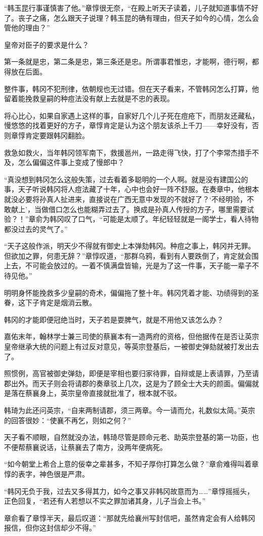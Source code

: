 “韩玉昆行事谨慎害了他。”章惇很无奈，“在殿上听天子读着，儿子就知道事情不好了。丧子之痛，怎么跟天子说理？韩玉昆的确有理由，但天子如今的心情，怎么会管他的理由？”

皇帝对臣子的要求是什么？

第一条就是忠，第二条是忠，第三条还是忠。所谓事君惟忠，才能啊，德行啊，都得放在后面。

整件事，韩冈不犯刑律，依朝规也无过错。但在天子看来，不管韩冈怎么打算，他留着能挽救皇嗣的种痘法没有献上去就是不忠的表现。

将心比心，如果自家遇上这样的事，自家好几个儿子死在痘疮下，而朋友还藏私，慢悠悠的找着更好的方子，章惇肯定是认为这个朋友该杀上千刀——幸好没有，否则章惇肯定要跟韩冈翻脸。

救急如救火，当年韩冈领军南下，救援邕州，一路走得飞快，打了个李常杰措手不及，怎么偏偏这件事上变成了慢郎中？

“真没想到韩冈怎么这般失策，过去看着多聪明的一个人啊。就是没有建国公的事，天子听说韩冈将人痘法藏了十年，心中也会好一阵不舒服。在奏章中，他根本就没必要将孙真人扯进来，直接说在广西无意中发现的不就好了？‘不经明验，不敢献上’，当做借口怎么也能糊弄过去了。换成是孙真人传授的方子，哪里需要试验？！”章俞为韩冈叹了口气，“可能是太顺了。年纪轻轻就是一阁学士，看人待物都没过去的灵气了。”

“天子这般作派，明天少不得就有御史上本弹劾韩冈。种痘之事上，韩冈并无罪。但欲加之罪，何患无辞？”章惇叹道，“那群乌鸦，看到有人要跌倒了，肯定就会围上去，不可能会放过的。一着不慎满盘皆输，光是为了这一件事，天子能一辈子不待见他。”

明明身怀能挽救多少皇嗣的奇术，偏偏拖了整十年。韩冈凭着才能、功绩得到的圣眷，这下子肯定是烟消云散。

韩冈的才能即便冠绝当时，天子若是耍脾气，就是不用他又该怎么办？

嘉佑末年，翰林学士兼三司使的蔡襄本有一造两府的资格，但他据传在是否让英宗皇帝继承大统的问题上有过反对意见，等英宗登基后，一被御史弹劾就被打发出去了。

照惯例，高官被御史弹劾，即便是宰相也要归家待罪，自辩或是上表请罪，乃至请郡出外。而天子则会将请郡的奏章驳上几次，这是为了顾全士大夫的颜面。偏偏就是落在蔡襄身上，英宗皇帝直接就批准了，根本就不驳。

韩琦为此还问英宗，“自来两制请郡，须三两章。今一请而允，礼数似太简。”英宗的回答很妙：“使襄不再乞，则如之何？”

天子看不顺眼，自然就没办法，韩琦尽管是顾命元老、助英宗登基的第一功臣，也不便帮蔡襄说话，让蔡襄去了南方，没两年便病死。

“如今朝堂上希合上意的佞幸之辈甚多，不知子厚你打算怎么做？”章俞难得叫着章惇的表字，神色很是严肃。

“韩冈无负于我，过去又多得其力，如今之事又非韩冈故意而为……”章惇摇摇头，正色回复，“若还有人若想以不实之罪加诸其身，儿子当会上书。”

章俞看了章惇半天，最后叹道：“那就先给襄州写封信吧，虽然肯定会有人给韩冈报信，但你这封信却少不得。”

